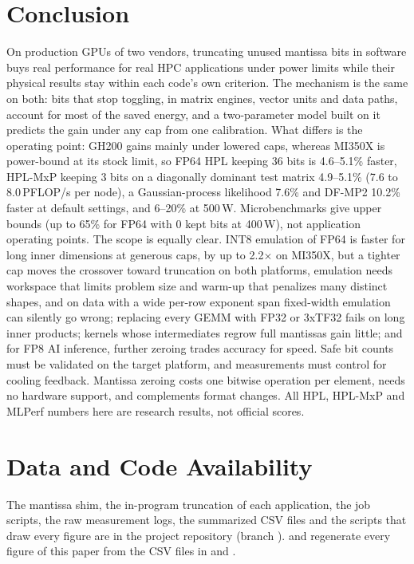 \documentclass[conference]{IEEEtran}
\newcommand{\W}{\,W}
\newcommand{\pct}{\%}
\begin{document}
\section{Conclusion}\label{sec:conclusion}

On production GPUs of two vendors, truncating unused mantissa bits in software buys real performance for real HPC
applications under power limits while their physical results stay within each code's own criterion. The mechanism is the
same on both: bits that stop toggling, in matrix engines, vector units and data paths, account for most of the saved
energy, and a two-parameter model built on it predicts the gain under any cap from one calibration. What differs is the
operating point: GH200 gains mainly under lowered caps, whereas MI350X is power-bound at its stock limit, so FP64 HPL
keeping 36 bits is 4.6--5.1\pct{} faster, HPL-MxP keeping 3 bits on a diagonally dominant test matrix 4.9--5.1\pct{}
(7.6 to 8.0\,PFLOP/s per node), a
Gaussian-process likelihood 7.6\pct{} and DF-MP2 10.2\pct{} faster at default settings, and 6--20\pct{} at 500\W.
Microbenchmarks give upper bounds (up to 65\pct{} for FP64 with 0 kept bits at 400\W), not application operating
points. The scope is equally clear. INT8 emulation of FP64 is faster for long inner dimensions at generous caps, by up
to 2.2$\times$ on MI350X, but a tighter cap moves the crossover toward truncation on both platforms, emulation needs
workspace that limits problem size and warm-up that penalizes many distinct shapes, and on data with a wide per-row
exponent span fixed-width emulation can silently go wrong; replacing every GEMM with FP32 or 3xTF32 fails on long inner
products; kernels whose intermediates regrow full mantissas gain little; and for FP8 AI inference, further zeroing
trades accuracy for speed. Safe bit counts must be validated on the target platform, and measurements must control for
cooling feedback. Mantissa zeroing costs one bitwise operation per element, needs no hardware support, and complements
format changes. All HPL, HPL-MxP and MLPerf numbers here are research results, not official scores.

\section*{Data and Code Availability}
The mantissa shim, the in-program truncation of each application, the job scripts, the raw measurement logs, the
summarized CSV files and the scripts that draw every figure are in the project repository (branch
).  and 
regenerate every figure of this paper from the CSV files in  and .
\end{document}
